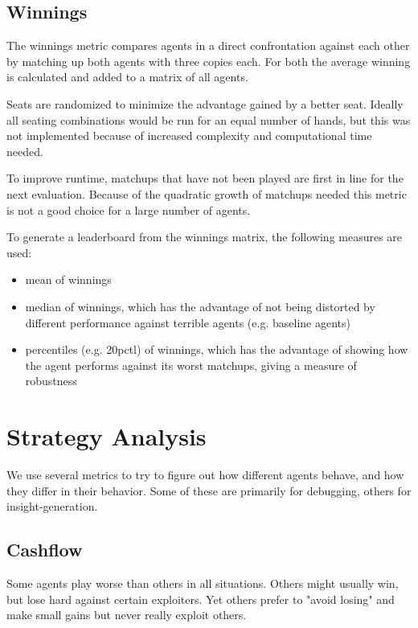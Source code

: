 \subsection{Winnings}
\label{Winnings}
The winnings metric compares agents in a direct confrontation against each other by matching up both agents with three copies each. For both the average winning is calculated and added to a matrix of all agents.

Seats are randomized to minimize the advantage gained by a better seat. Ideally all seating combinations would be run for an equal number of hands, but this was not implemented because of increased complexity and computational time needed.

To improve runtime, matchups that have not been played are first in line for the next evaluation. Because of the quadratic growth of matchups needed this metric is not a good choice for a large number of agents.

To generate a leaderboard from the winnings matrix, the following measures are used:
\begin{itemize}
    \item mean of winnings
    \item median of winnings, which has the advantage of not being distorted by different performance against terrible agents (e.g. baseline agents)
    \item percentiles (e.g. 20pctl) of winnings, which has the advantage of showing how the agent performs against its worst matchups, giving a measure of robustness
\end{itemize}

\section{Strategy Analysis}

We use several metrics to try to figure out how different agents behave, and how they differ in their behavior. Some of these are primarily for debugging, others for insight-generation.

\subsection{Cashflow}

Some agents play worse than others in all situations. Others might usually win, but lose hard against certain exploiters. Yet others prefer to "avoid losing" and make small gains but never really exploit others.

